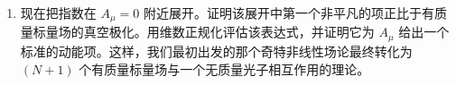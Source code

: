 \begin{enumerate}[label=(\alph*)]
\begin{equation}
      Z = \int \mathcal{D}\lambda\,\mathcal{D}A\ \exp\Bigl[ -iN\,
        \mathrm{tr}\log\bigl( -D^2 - \lambda \bigr) + \frac{iN}{g^2}\int d^2x\
          \lambda \Bigr] ,
    \end{equation}
    其中我们只保留了 $N\to\infty$、$g^2N$ 固定时的领头项。用类似于我们用于非线性西格马模型的方法，考察指数对 $\lambda$ 和 $A_\mu$ 极小化的条件。证明这些条件在 $A_\mu = 0$ 和 $\lambda = m^2 > 0$ 处有解。证明：如果 $g^2$ 在标度 $M$ 处重整化，$m$ 可以写为
    \begin{equation}
      m = M\ \exp\Bigl( -\frac{2\pi}{Ng^2} \Bigr) .
    \end{equation}
  \item 现在把指数在 $A_\mu = 0$ 附近展开。证明该展开中第一个非平凡的项正比于有质量标量场的真空极化。用维数正规化评估该表达式，并证明它为 $A_\mu$ 给出一个标准的动能项。这样，我们最初出发的那个奇特非线性场论最终转化为 $(N+1)$ 个有质量标量场与一个无质量光子相互作用的理论。
\end{enumerate}
